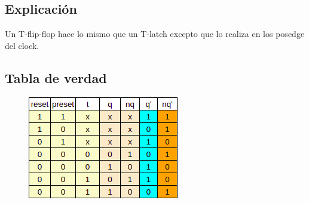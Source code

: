 \subsection*{Explicación}
Un T-flip-flop hace lo mismo que un T-latch excepto que lo realiza en los posedge del clock.

\subsection*{Tabla de verdad}
\begin{figure}[h]
    \centering
    \includegraphics{fotos/TruthTable/arki-lab2-TT_tflipflop.png}
\end{figure}


%    
